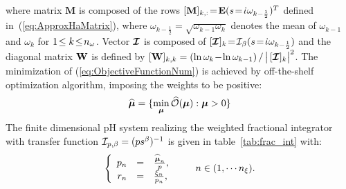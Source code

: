 \documentclass[10pt,a4paper]{article}
\begin{document}
where matrix $\mathbf M$ is composed of the rows
$[\mathbf M]_{k,:}\!=\!\mathbf E (s\!=\!{\dot\iota}\omega_{k-\frac{1}{2}})^T$
defined in~(\ref{eq:ApproxHaMatrix}), where $\omega_{k-\frac{1}{2}}\!=\!\sqrt{
  \omega_{k-1} \omega_k}$ denotes the mean of $\omega_{k-1}$
and $\omega_k$ for $1\!\leq k\!\leq\! {n_\omega}$. 
Vector $\boldsymbol{{\mathcal{I}}}$ is composed of
$[\boldsymbol{{\mathcal{I}}}]_k\!=\!{{\mathcal{I}}}_\beta(s\!=\!{\dot\iota}\omega_{k-\frac{1}{2}})$ and
the diagonal
matrix ${\mathbf{W}}$ is defined by $[{\mathbf{W}}]_{k,k}=(\ln \omega_{k} \!-\! \ln
\omega_{k-1})\,/\, \big|\, [\boldsymbol{{\mathcal{I}}}]_k \big|^2$.
The minimization of (\ref{eq:ObjectiveFunctionNum}) is achieved by off-the-shelf optimization algorithm, imposing the weights to be positive: 
\begin{equation}
\label{eq:minimization}
 \widehat{\boldsymbol{\mu}} = \{\min_{\boldsymbol{\mu}}  \widehat{\mathcal{O}}(\boldsymbol{\mu}) : \boldsymbol{\mu}>0\}
\end{equation}
The finite dimensional pH system realizing the weighted fractional integrator with transfer function ${\mathcal{I}}_{p,\beta} = (ps^\beta)^{-1}$ is given in table~\ref{tab:frac_int} with:
\begin{equation}
\label{eq:frac_int_parameters}
\left\{\begin{array}{rcl}
p_n&=&\frac{\widehat{\boldsymbol{\mu}}_n}{p},\\
r_n&=&\frac{\xi_n}{p_n},
\end{array}\right.\qquad n \in (1,\cdots {n_\xi}).
\end{equation}
%
\end{document}
